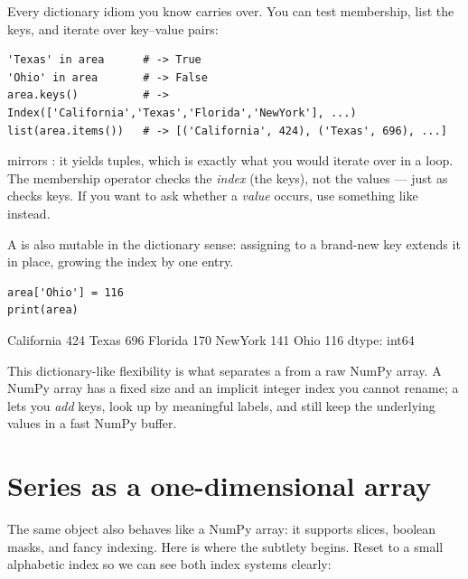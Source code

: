 \documentclass[11pt]{article}
\begin{document}
Every dictionary idiom you know carries over. You can test membership, list the keys, and iterate over key--value pairs:

\begin{lstlisting}
'Texas' in area      # -> True
'Ohio' in area       # -> False
area.keys()          # -> Index(['California','Texas','Florida','NewYork'], ...)
list(area.items())   # -> [('California', 424), ('Texas', 696), ...]
\end{lstlisting}

\begin{pyrefresh}
 mirrors : it yields  tuples, which is exactly what you would iterate over in a  loop. The membership operator  checks the \emph{index} (the keys), not the values --- just as  checks keys. If you want to ask whether a \emph{value} occurs, use something like  instead.
\end{pyrefresh}

A  is also mutable in the dictionary sense: assigning to a brand-new key extends it in place, growing the index by one entry.

\begin{lstlisting}
area['Ohio'] = 116
print(area)
\end{lstlisting}

\begin{outblock}
California    424
Texas         696
Florida       170
NewYork       141
Ohio          116
dtype: int64
\end{outblock}

\begin{keyidea}
This dictionary-like flexibility is what separates a  from a raw NumPy array. A NumPy array has a fixed size and an implicit integer index you cannot rename; a  lets you \emph{add} keys, look up by meaningful labels, and still keep the underlying values in a fast NumPy buffer.
\end{keyidea}

\section{Series as a one-dimensional array}

The same object also behaves like a NumPy array: it supports slices, boolean masks, and fancy indexing. Here is where the subtlety begins. Reset to a small alphabetic index so we can see both index systems clearly:
\end{document}
